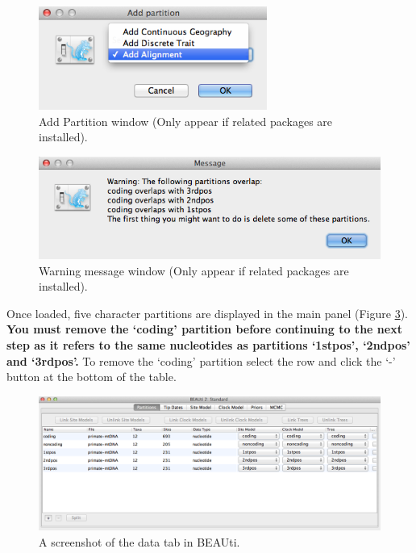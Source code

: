 \documentclass[11pt]{article}
\theoremstyle{plain}%
\theoremstyle{definition}
\theoremstyle{remark}
\begin{document}
\begin{figure}
\centering	
\includegraphics[width=7.5cm]{figures/AddPartition.png}
\caption{Add Partition window (Only appear if related packages are installed).}
\label{fig:addPartition}
\end{figure}

\begin{figure}	
\includegraphics[width=\textwidth]{figures/warning.png}
\caption{Warning message window (Only appear if related packages are installed).}
\label{fig:warning}
\end{figure}

Once loaded, five character partitions are displayed in the main panel (Figure \ref{fig:BEAUTI_DataPartitions}). {\bf You must remove the `coding' partition before continuing to the next step as it refers to the same nucleotides as partitions `1stpos', `2ndpos' and `3rdpos'.} To remove the `coding' partition select the row and click the `-' button at the bottom of the table. 

\begin{figure}

\includegraphics[width=\textwidth]{figures/BEAUti_DataPartitions}
\caption{A screenshot of the data tab in BEAUti.}
\label{fig:BEAUTI_DataPartitions}
\end{figure}
\end{document}
